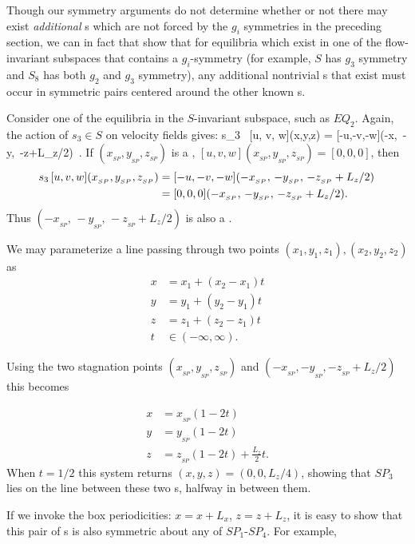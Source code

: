 \documentclass[letter,12pt,openany]{article}
\begin{document}
Though our symmetry arguments do not determine whether or not there may exist \textit{additional} {\stagp}s which are not forced by the $g_i$ symmetries in the preceding section, we can in fact that show that for equilibria which exist in one of the flow-invariant subspaces that contains a $g_i$-symmetry (for example, $S$ has $g_3$ symmetry and $S_8$ has both $g_2$ and $g_3$ symmetry), any additional nontrivial {\stagp}s that exist must occur in symmetric pairs centered around the other known {\stagp}s.

Consider one of the equilibria in the $S$-invariant subspace, such as $EQ_2$. Again, the
 action of $s_3 \in S$ on velocity fields gives:
 \beq    s_3 \, [u, v, w](x,y,z) = [-u,-v,-w](-x,\, -y,\, -z+L_z/2)\nnu\, .
 \eeq
 If $(x_{_{SP}},y_{_{SP}},z_{_{SP}})$ is a \stagp, $[u, v,
 w](x_{_{SP}},y_{_{SP}},z_{_{SP}}) = [0,0,0]$, then
 \begin{align} s_3 \, [u, v, w](x_{_{SP}},y_{_{SP}},z_{_{SP}}) &= [-u,-v,-w](-x_{_{SP}},\, -y_{_{SP}},\, -z_{_{SP}}+L_z/2) \nonumber\, \\
 &= [0,0,0](-x_{_{SP}},\, -y_{_{SP}},\, -z_{_{SP}}+L_z/2) .
 \end{align}
 Thus $(-x_{_{SP}},\, -y_{_{SP}},\, -z_{_{SP}}+L_z/2)$ is also a \stagp.

We may parameterize a line passing through two points 
$(x_{1}, y_{1}, z_{1}),(x_{2}, y_{2}, z_{2})$
 as
 \begin{align}
  x &= x_{1} + (x_{2} - x_{1})t \\
  y &= y_{1} + (y_{2} - y_{1})t \\
  z &= z_{1} + (z_{2} - z_{1})t \\
  t &\in (-\infty,\infty) .
 \end{align}

 Using the two stagnation points $(x_{_{SP}},y_{_{SP}},z_{_{SP}})$ and $(-x_{_{SP}},-y_{_{SP}},-z_{_{SP}} + L_z/2)$ this becomes
 
 \begin{align}
  x &= x_{_{SP}}(1-2t) \\
  y &= y_{_{SP}}(1-2t) \\
  z &= z_{_{SP}}(1-2t) + \frac{L_{z}}{2} t .
 \end{align}
When $t = 1/2$ this system returns $(x,y,z) = (0,0,L_{z}/4)$, showing 
that $SP_3$ lies on the line between these two \stagp s, halfway in 
between them. 

If we invoke the box periodicities: $x = x + L_{x}$, $z = z + L_{z}$, it 
is easy to show that this pair of {\stagp}s is also symmetric about any 
of $SP_1$-$SP_4$. For example, \\ 
\end{document}
